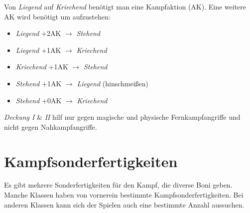 Von \textit{Liegend} auf \textit{Kriechend} benötigt man eine Kampfaktion (AK). Eine weitere AK wird benötigt um aufzustehen: 

\begin{itemize}
\item \textit{Liegend} +2AK $\rightarrow$ \textit{Stehend}
\item \textit{Liegend} +1AK $\rightarrow$ \textit{Kriechend}
\item \textit{Kriechend} +1AK $\rightarrow$ \textit{Stehend}
\item \textit{Stehend} +1AK $\rightarrow$ \textit{Liegend} (hinschmeißen)
\item \textit{Stehend} +0AK $\rightarrow$ \textit{Kriechend}
\end{itemize}

\textit{Deckung I} \& \textit{II} hilf nur gegen magische und physische Fernkampfangriffe und nicht gegen Nahkampfangriffe.


\section{Kampfsonderfertigkeiten}
Es gibt mehrere Sonderfertigkeiten für den Kampf, die diverse Boni geben. Manche Klassen haben von vornerein bestimmte Kampfsonderfertigkeiten. Bei anderen Klassen kann sich der Spielen auch eine bestimmte Anzahl aussuchen.

